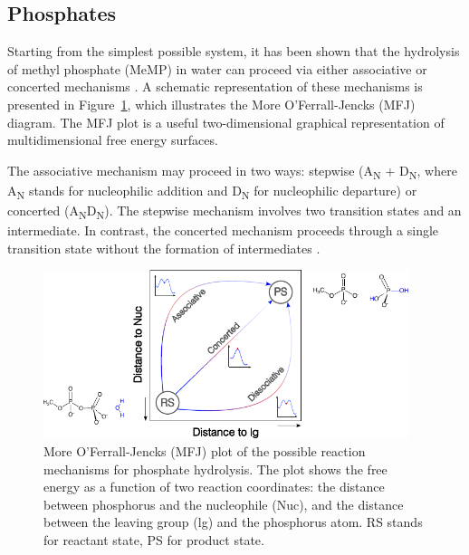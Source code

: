 \subsection{Phosphates} \label{subsec:phosphates}
Starting from the simplest possible system, it has been shown that the hydrolysis of methyl phosphate (MeMP) in water can proceed via either associative or concerted mechanisms \citep{kamerlinWhyNatureReally2013, kamerlinAssociativeDissociativeMechanisms2008, klahnMechanismHydrolysisPhosphate2006, duarteResolvingApparentConflicts2015}. A schematic representation of these mechanisms is presented in Figure~\ref{fig:mfj_plot}, which illustrates the More O'Ferrall-Jencks (MFJ) diagram. The MFJ plot is a useful two-dimensional graphical representation of multidimensional free energy surfaces.

The associative mechanism may proceed in two ways: stepwise (A\textsubscript{N} + D\textsubscript{N}, where A\textsubscript{N} stands for nucleophilic addition and D\textsubscript{N} for nucleophilic departure) or concerted (A\textsubscript{N}D\textsubscript{N}). The stepwise mechanism involves two transition states and an intermediate. In contrast, the concerted mechanism proceeds through a single transition state without the formation of intermediates \citep{duarteResolvingApparentConflicts2015}.

\begin{figure}[t!]
    \centering
    \includegraphics[width=0.95\textwidth]{Figures/1_Introduction/intro_mfj_plot.pdf}
    \caption{More O'Ferrall-Jencks (MFJ) plot of the possible reaction mechanisms for phosphate hydrolysis. The plot shows the free energy as a function of two reaction coordinates: the distance between phosphorus and the nucleophile (Nuc), and the distance between the leaving group (lg) and the phosphorus atom. RS stands for reactant state, PS for product state.}
    \label{fig:mfj_plot}
\end{figure}

